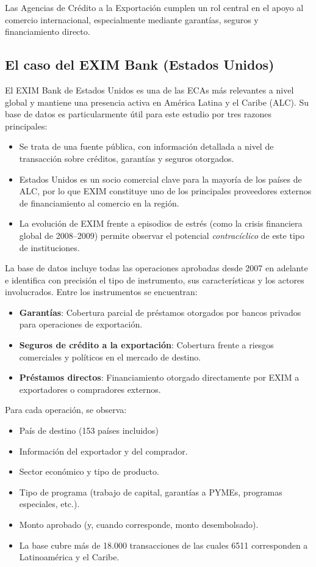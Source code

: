 \documentclass[11pt]{article}
\begin{document}
Las Agencias de Crédito a la Exportación  cumplen un rol central en el apoyo al comercio internacional, especialmente mediante garantías, seguros y financiamiento directo.

\subsection{El caso del EXIM Bank (Estados Unidos)}

 El EXIM Bank de Estados Unidos es una de las ECAs más relevantes a nivel global y mantiene una presencia activa en América Latina y el Caribe (ALC). Su base de datos es particularmente útil para este estudio por tres razones principales:

\begin{itemize}
    \item Se trata de una fuente pública, con información detallada a nivel de transacción sobre créditos, garantías y seguros otorgados.
    \item Estados Unidos es un socio comercial clave para la mayoría de los países de ALC, por lo que EXIM constituye uno de los principales proveedores externos de financiamiento al comercio en la región.
    \item La evolución de EXIM frente a episodios de estrés (como la crisis financiera global de 2008--2009) permite observar el potencial \emph{contracíclico} de este tipo de instituciones.
\end{itemize}

La base de datos incluye todas las operaciones aprobadas desde 2007 en adelante e identifica con precisión el tipo de instrumento, sus características y los actores involucrados. Entre los instrumentos se encuentran:

\begin{itemize}
    \item \textbf{Garantías}: Cobertura parcial de préstamos otorgados por bancos privados para operaciones de exportación.
    \item \textbf{Seguros de crédito a la exportación}: Cobertura frente a riesgos comerciales y políticos en el mercado de destino.
    \item \textbf{Préstamos directos}: Financiamiento otorgado directamente por EXIM a exportadores o compradores externos.
\end{itemize}

Para cada operación, se observa:

\begin{itemize}
    \item País de destino (153 países incluidos)
    \item Información del exportador y del comprador.
    \item Sector económico y tipo de producto.
    \item Tipo de programa (trabajo de capital, garantías a PYMEs, programas especiales, etc.).
    \item Monto aprobado (y, cuando corresponde, monto desembolsado).
    \item La base cubre más de 18.000 transacciones de las cuales 6511 corresponden a Latinoamérica y el Caribe.
\end{itemize}
\end{document}
